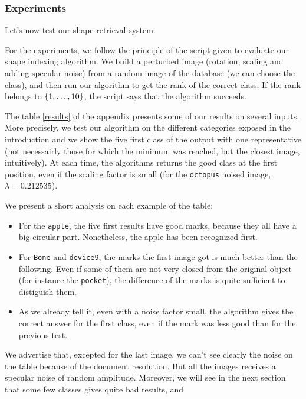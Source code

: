 \subsubsection{Experiments}

Let's now test our shape retrieval system.

For the experiments, we follow the principle of the script given to evaluate our shape indexing algorithm. We build a perturbed image (rotation, scaling and adding specular noise) from a random image of the database (we can choose the class), and then run our algorithm to get the rank of the correct class. If the rank belongs to $\left\{ 1,\dots,10 \right\}$, the script says that the algorithm succeeds.

The table \ref{results} of the appendix presents some of our results on several inputs. More precisely, we test our algorithm on the different categories exposed in the introduction and we show the five first class of the output with one representative (not necessairly those for which the minimum was reached, but the closest image, intuitively). At each time, the algorithms returns the good class at the first position, even if the scaling factor is small (for the \texttt{octopus} noised image, $\lambda = 0.212535$).

We present a short analysis on each example of the table:

\begin{itemize}
	\item For the \texttt{apple}, the five first results have good marks, because they all have a big circular part. Nonetheless, the apple has been recognized first.
	\item For \texttt{Bone} and \texttt{device9}, the marks the first image got is much better than the following. Even if some of them are not very closed from the original object (for instance the \texttt{pocket}), the difference of the marks is quite sufficient to distiguish them.
	\item As we already tell it, even with a noise factor small, the algorithm gives the correct answer for the first class, even if the mark was less good than for the previous test.
\end{itemize}

We advertise that, excepted for the last image, we can't see clearly the noise on the table because of the document resolution. But all the images receives a specular noise of random amplitude. Moreover, we will see in the next section that some few classes gives quite bad results, and 

